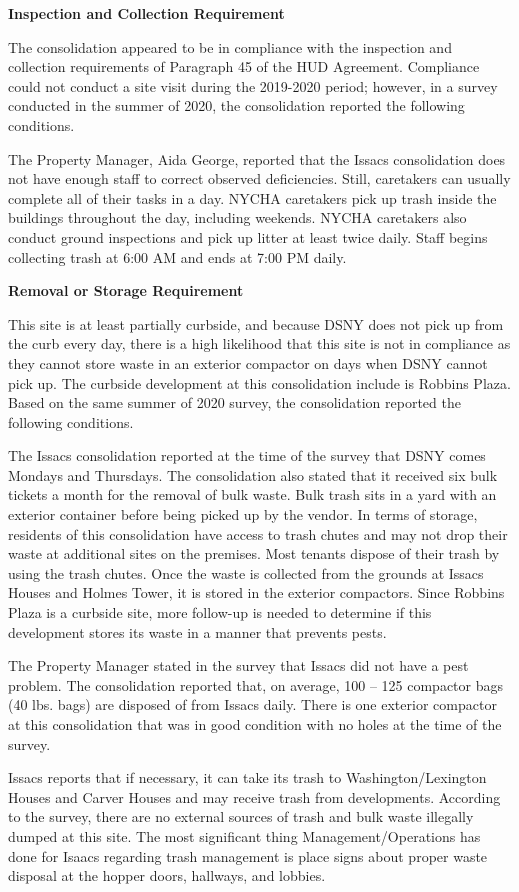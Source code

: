  

\textbf{Inspection and Collection Requirement} 

 

The consolidation appeared to be in compliance with the inspection and collection requirements of Paragraph 45 of the HUD Agreement. Compliance could not conduct a site visit during the 2019-2020 period; however, in a survey conducted in the summer of 2020, the consolidation reported the following conditions. 

The Property Manager, Aida George, reported that the Issacs consolidation does not have enough staff to correct observed deficiencies. Still, caretakers can usually complete all of their tasks in a day. NYCHA caretakers pick up trash inside the buildings throughout the day, including weekends. NYCHA caretakers also conduct ground inspections and pick up litter at least twice daily. Staff begins collecting trash at 6:00 AM and ends at 7:00 PM daily. 

 

\textbf{Removal or Storage Requirement} 

This site is at least partially curbside, and because DSNY does not pick up from the curb every day, there is a high likelihood that this site is not in compliance as they cannot store waste in an exterior compactor on days when DSNY cannot pick up. The curbside development at this consolidation include is Robbins Plaza. Based on the same summer of  2020  survey, the consolidation reported the following conditions.

 

The Issacs consolidation reported at the time of the survey that DSNY comes Mondays and Thursdays. The consolidation also stated that it received six bulk tickets a month for the removal of bulk waste. Bulk trash sits in a yard with an exterior container before being picked up by the vendor. In terms of storage, residents of this consolidation have access to trash chutes and may not drop their waste at additional sites on the premises. Most tenants dispose of their trash by using the trash chutes. Once the waste is collected from the grounds at Issacs Houses and Holmes Tower, it is stored in the exterior compactors.  Since Robbins Plaza is a curbside site, more follow-up is needed to determine if this development stores its waste in a manner that prevents pests. 

 

The Property Manager stated in the survey that Issacs did not have a pest problem.  The consolidation reported that, on average, 100 -- 125 compactor bags (40 lbs. bags) are disposed of from Issacs daily. There is one exterior compactor at this consolidation that was in good condition with no holes at the time of the survey.

Issacs reports that if necessary, it can take its trash to Washington/Lexington Houses and Carver Houses and may receive trash from developments. According to the survey, there are no external sources of trash and bulk waste illegally dumped at this site. The most significant thing Management/Operations has done for Isaacs regarding trash management is place signs about proper waste disposal at the hopper doors, hallways, and lobbies.
